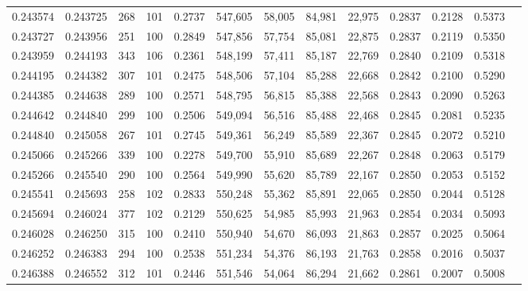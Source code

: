 \begin{tabular}{rrrrrrrrrrrrr}
0.243574 & 0.243725 &   268 & 101 &                                     0.2737 & 547,605 &  58,005 &  84,981 &  22,975 & 0.2837 & 0.2128 & 0.5373 \\
0.243727 & 0.243956 &   251 & 100 &                                     0.2849 & 547,856 &  57,754 &  85,081 &  22,875 & 0.2837 & 0.2119 & 0.5350 \\
0.243959 & 0.244193 &   343 & 106 &                                     0.2361 & 548,199 &  57,411 &  85,187 &  22,769 & 0.2840 & 0.2109 & 0.5318 \\
0.244195 & 0.244382 &   307 & 101 &                                     0.2475 & 548,506 &  57,104 &  85,288 &  22,668 & 0.2842 & 0.2100 & 0.5290 \\
0.244385 & 0.244638 &   289 & 100 &                                     0.2571 & 548,795 &  56,815 &  85,388 &  22,568 & 0.2843 & 0.2090 & 0.5263 \\
0.244642 & 0.244840 &   299 & 100 &                                     0.2506 & 549,094 &  56,516 &  85,488 &  22,468 & 0.2845 & 0.2081 & 0.5235 \\
0.244840 & 0.245058 &   267 & 101 &                                     0.2745 & 549,361 &  56,249 &  85,589 &  22,367 & 0.2845 & 0.2072 & 0.5210 \\
0.245066 & 0.245266 &   339 & 100 &                                     0.2278 & 549,700 &  55,910 &  85,689 &  22,267 & 0.2848 & 0.2063 & 0.5179 \\
0.245266 & 0.245540 &   290 & 100 &                                     0.2564 & 549,990 &  55,620 &  85,789 &  22,167 & 0.2850 & 0.2053 & 0.5152 \\
0.245541 & 0.245693 &   258 & 102 &                                     0.2833 & 550,248 &  55,362 &  85,891 &  22,065 & 0.2850 & 0.2044 & 0.5128 \\
0.245694 & 0.246024 &   377 & 102 &                                     0.2129 & 550,625 &  54,985 &  85,993 &  21,963 & 0.2854 & 0.2034 & 0.5093 \\
0.246028 & 0.246250 &   315 & 100 &                                     0.2410 & 550,940 &  54,670 &  86,093 &  21,863 & 0.2857 & 0.2025 & 0.5064 \\
0.246252 & 0.246383 &   294 & 100 &                                     0.2538 & 551,234 &  54,376 &  86,193 &  21,763 & 0.2858 & 0.2016 & 0.5037 \\
0.246388 & 0.246552 &   312 & 101 &                                     0.2446 & 551,546 &  54,064 &  86,294 &  21,662 & 0.2861 & 0.2007 & 0.5008 \\

\end{tabular}
